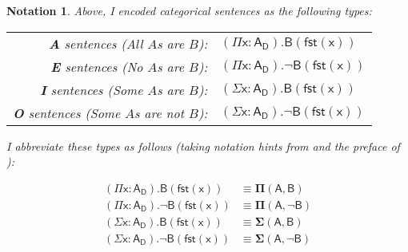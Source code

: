 \documentclass{article}
\newtheorem{notation}{Notation}
\newcommand\e{\mathsf}
\def\Domain/{\e{D}}
\newcommand\Dep[2]{\e{#1(#2)}}
\def\PiBinder/{\e{\Pi}}
\def\SigmaBinder/{\e{\Sigma}}
\newcommand\Abstr[3]{\e{(\PiBinder/#1 : #2). #3}}
\newcommand\Prod[3]{\e{(\SigmaBinder/#1 : #2). #3}}
\newcommand\First[1]{\e{fst(#1)}}
\newcommand\Gen[2]{\e{#1_{#2}}}
\newcommand\PI[2]{\mathbf{\Pi}\e{(#1, #2)}}
\newcommand\SIG[2]{\mathbf{\Sigma}\e{(#1, #2)}}
\begin{document}
\begin{notation}

Above, I encoded categorical sentences as the following types:

\begin{center}
\begin{tabular}{r l}
  \textbf{A} sentences (All $A$s are $B$): & $\Abstr{x}{\Gen{A}{\Domain/}}{\Dep{B}{\First{x}}}$ \\
  \textbf{E} sentences (No $A$s are $B$): & $\Abstr{x}{\Gen{A}{\Domain/}}{\lnot \Dep{B}{\First{x}}}$ \\
  \textbf{I} sentences (Some $A$s are $B$): & $\Prod{x}{\Gen{A}{\Domain/}}{\Dep{B}{\First{x}}}$ \\
  \textbf{O} sentences (Some $A$s are not $B$): & $\Prod{x}{\Gen{A}{\Domain/}}{\lnot \Dep{B}{\First{x}}}$
\end{tabular}
\end{center}

I abbreviate these types as follows (taking notation hints from \citealt{VonPlato2016} and the preface of \citealt{MartinLof1984}):

\begin{align*}
  \Abstr{x}{\Gen{A}{\Domain/}}{\Dep{B}{\First{x}}} &\equiv \PI{A}{B} \\
  \Abstr{x}{\Gen{A}{\Domain/}}{\lnot \Dep{B}{\First{x}}} &\equiv \PI{A}{\lnot B} \\
  \Prod{x}{\Gen{A}{\Domain/}}{\Dep{B}{\First{x}}} &\equiv \SIG{A}{B} \\
  \Prod{x}{\Gen{A}{\Domain/}}{\lnot \Dep{B}{\First{x}}} &\equiv \SIG{A}{\lnot B}
\end{align*}

\end{notation}
\end{document}

